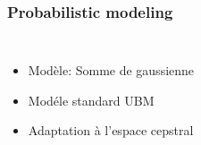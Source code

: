 \documentclass[11pt,english]{beamer}
\begin{document}
\begin{frame}
  \frametitle{Probabilistic modeling}
  \begin{columns}
    \begin{itemize}
    \item Modèle: Somme de gaussienne
    \item Modéle standard UBM
    \item<2> Adaptation à l'espace cepstral
    \end{itemize}
  \end{columns}
\end{frame}
\end{document}
